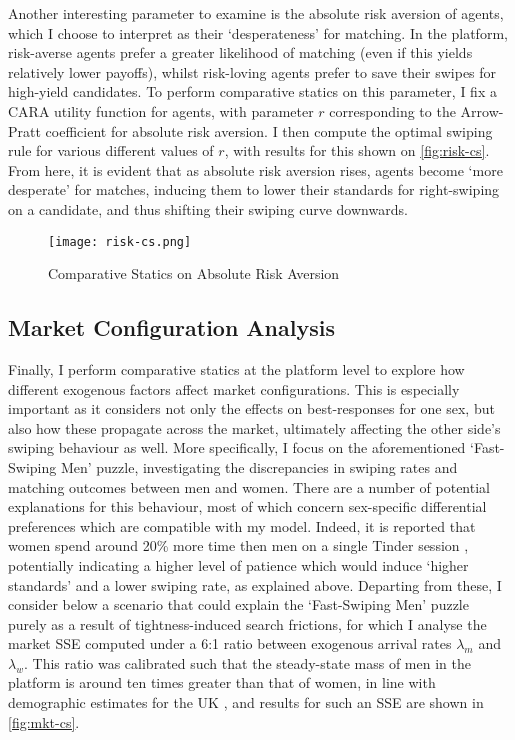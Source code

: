 Another interesting parameter to examine is the absolute risk aversion of agents, which I choose to interpret as their `desperateness' for matching.
In the platform, risk-averse agents prefer a greater likelihood of matching (even if this yields relatively lower payoffs), whilst risk-loving agents prefer to save their swipes for high-yield candidates. 
To perform comparative statics on this parameter, I fix a CARA utility function for agents, with parameter $r$ corresponding to the Arrow-Pratt coefficient for absolute risk aversion. 
I then compute the optimal swiping rule for various different values of $r$, with results for this shown on \autoref{fig:risk-cs}.
From here, it is evident that as absolute risk aversion rises, agents become `more desperate' for matches, inducing them to lower their standards for right-swiping on a candidate, and thus shifting their swiping curve downwards.

\begin{figure}[ht]
    \centering
    \caption{Comparative Statics on Absolute Risk Aversion}
    \texttt{[image: risk-cs.png]}
    \label{fig:risk-cs} 
\end{figure}

\subsection{Market Configuration Analysis}\label{sec:section3.3} 
Finally, I perform comparative statics at the platform level to explore how different exogenous factors affect market configurations. 
This is especially important as it considers not only the effects on best-responses for one sex, but also how these propagate across the market, ultimately affecting the other side's swiping behaviour as well. 
More specifically, I focus on the aforementioned `Fast-Swiping Men' puzzle, investigating the discrepancies in swiping rates and matching outcomes between men and women. 
There are a number of potential explanations for this behaviour, most of which concern sex-specific differential preferences which are compatible with my model. 
Indeed, it is reported that women spend around 20\% more time then men on a single Tinder session \citep{web:nytimes_patience}, potentially indicating a higher level of patience which would induce `higher standards' and a lower swiping rate, as explained above.
Departing from these, I consider below a scenario that could explain the `Fast-Swiping Men' puzzle purely as a result of tightness-induced search frictions, for which I analyse the market SSE computed under a 6:1 ratio between exogenous arrival rates $\lambda_m$ and $\lambda_w$.  
This ratio was calibrated such that the steady-state mass of men in the platform is around ten times greater than that of women, in line with demographic estimates for the UK \citep{web:tinder_stats}, and results for such an SSE are shown in \autoref{fig:mkt-cs}. 


